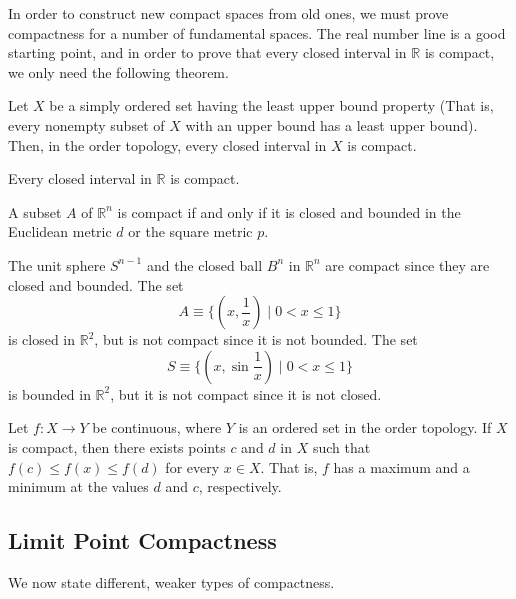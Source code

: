 \documentclass{article}
\begin{document}
    In order to construct new compact spaces from old ones, we must prove compactness for a number of fundamental spaces. The real number line is a good starting point, and in order to prove that every closed interval in $\mathbb{R}$ is compact, we only need the following theorem. 

    \begin{theorem}
    Let $X$ be a simply ordered set having the least upper bound property (That is, every nonempty subset of $X$ with an upper bound has a least upper bound). Then, in the order topology, every closed interval in $X$ is compact. 
    \end{theorem}

    \begin{corollary}
    Every closed interval in $\mathbb{R}$ is compact. 
    \end{corollary}

    \begin{theorem}
    A subset $A$ of $\mathbb{R}^n$ is compact if and only if it is closed and bounded in the Euclidean metric $d$ or the square metric $p$. 
    \end{theorem}

    \begin{example}
    The unit sphere $S^{n-1}$ and the closed ball $B^n$ in $\mathbb{R}^n$ are compact since they are closed and bounded. The set
    \[A \equiv \{(x, \frac{1}{x}) \; | \; 0 < x \leq 1\}\]
    is closed in $\mathbb{R}^2$, but is not compact since it is not bounded. The set 
    \[S \equiv \{(x, \sin{\frac{1}{x}}) \; | \; 0<x\leq 1\}\]
    is bounded in $\mathbb{R}^2$, but it is not compact since it is not closed. 
    \end{example}

    \begin{theorem}
    Let $f: X \longrightarrow Y$ be continuous, where $Y$ is an ordered set in the order topology. If $X$ is compact, then there exists points $c$ and $d$ in $X$ such that $f(c) \leq f(x) \leq f(d)$ for every $x \in X$. That is, $f$ has a maximum and a minimum at the values $d$ and $c$, respectively. 
    \end{theorem}

  \subsection{Limit Point Compactness}

    We now state different, weaker types of compactness. 
\end{document}
